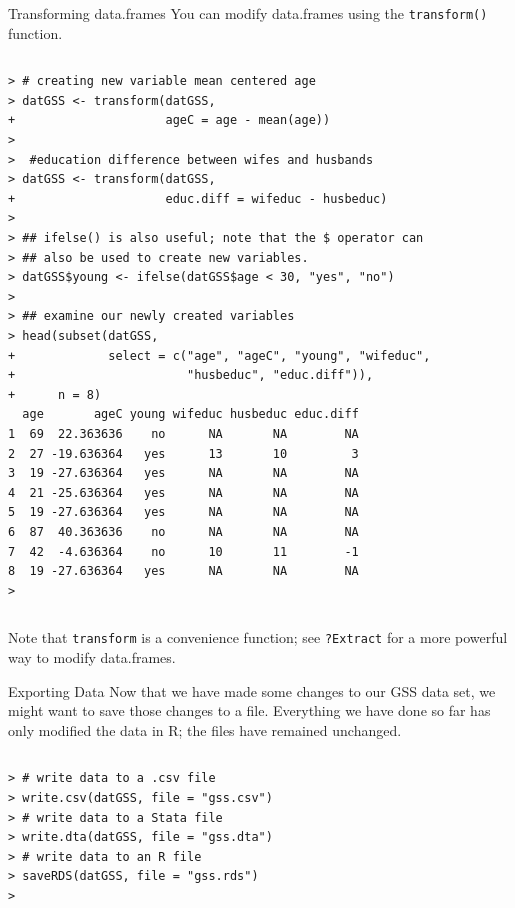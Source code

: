 \documentclass[table,smaller]{beamer}
\begin{document}
\begin{frame}[fragile,label=sec-6-5]{Transforming data.frames}
 You can modify data.frames using the \texttt{transform()} function. 

\vspace{-.5em}
\begin{columns}
\begin{block}{}
\begin{verbatim}
> # creating new variable mean centered age
> datGSS <- transform(datGSS,
+                     ageC = age - mean(age))
> 
>  #education difference between wifes and husbands
> datGSS <- transform(datGSS,
+                     educ.diff = wifeduc - husbeduc)
> 
> ## ifelse() is also useful; note that the $ operator can
> ## also be used to create new variables.
> datGSS$young <- ifelse(datGSS$age < 30, "yes", "no")
> 
> ## examine our newly created variables
> head(subset(datGSS,
+             select = c("age", "ageC", "young", "wifeduc",
+                        "husbeduc", "educ.diff")),
+      n = 8)
  age       ageC young wifeduc husbeduc educ.diff
1  69  22.363636    no      NA       NA        NA
2  27 -19.636364   yes      13       10         3
3  19 -27.636364   yes      NA       NA        NA
4  21 -25.636364   yes      NA       NA        NA
5  19 -27.636364   yes      NA       NA        NA
6  87  40.363636    no      NA       NA        NA
7  42  -4.636364    no      10       11        -1
8  19 -27.636364   yes      NA       NA        NA
>
\end{verbatim}
\end{block}
\end{columns}
\vspace{.5em}

Note that \texttt{transform} is a convenience function; see \texttt{?Extract} for a more powerful way to modify data.frames.
\end{frame}

\begin{frame}[fragile,label=sec-6-6]{Exporting Data}
 Now that we have made some changes to our GSS data set, we might want to save those changes to a file. Everything we have done so far has only modified the data in R; the files have remained unchanged. 

\vspace{-.5em}
\begin{columns}
\begin{block}{}
\begin{verbatim}
> # write data to a .csv file
> write.csv(datGSS, file = "gss.csv")
> # write data to a Stata file
> write.dta(datGSS, file = "gss.dta")
> # write data to an R file
> saveRDS(datGSS, file = "gss.rds")
>
\end{verbatim}
\end{block}
\end{columns}
\vspace{.5em}
\end{frame}
\end{document}
